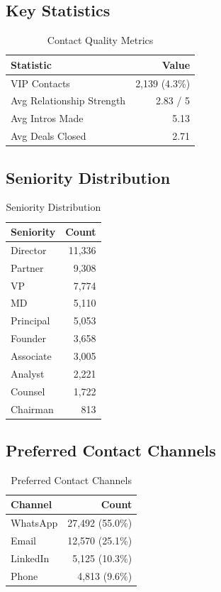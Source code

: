 \documentclass[12pt, a4paper]{report}
\begin{document}
\subsection{Key Statistics}

\begin{table}[H]
\centering
\begin{tabular}{lr}
\toprule
\textbf{Statistic} & \textbf{Value} \\
\midrule
VIP Contacts & 2,139 (4.3\%) \\
Avg Relationship Strength & 2.83 / 5 \\
Avg Intros Made & 5.13 \\
Avg Deals Closed & 2.71 \\
\bottomrule
\end{tabular}
\caption{Contact Quality Metrics}
\end{table}

\subsection{Seniority Distribution}

\begin{table}[H]
\centering
\begin{tabular}{lr}
\toprule
\textbf{Seniority} & \textbf{Count} \\
\midrule
Director & 11,336 \\
Partner & 9,308 \\
VP & 7,774 \\
MD & 5,110 \\
Principal & 5,053 \\
Founder & 3,658 \\
Associate & 3,005 \\
Analyst & 2,221 \\
Counsel & 1,722 \\
Chairman & 813 \\
\bottomrule
\end{tabular}
\caption{Seniority Distribution}
\end{table}

\subsection{Preferred Contact Channels}

\begin{table}[H]
\centering
\begin{tabular}{lr}
\toprule
\textbf{Channel} & \textbf{Count} \\
\midrule
WhatsApp & 27,492 (55.0\%) \\
Email & 12,570 (25.1\%) \\
LinkedIn & 5,125 (10.3\%) \\
Phone & 4,813 (9.6\%) \\
\bottomrule
\end{tabular}
\caption{Preferred Contact Channels}
\end{table}
\end{document}
